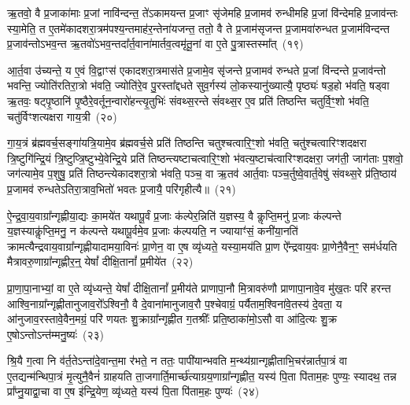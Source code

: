 ऋ॒तवो॒ वै प्र॒जाका॑माः प्र॒जां नावि॑न्दन्त॒ ते॑\-ऽकामयन्त प्र॒जाꣳ सृ॑जेमहि प्र॒जामव॑ रुन्धीमहि प्र॒जां वि॑न्देमहि प्र॒जाव॑न्तः स्या॒मेति॒ त ए॒तमे॑कादशरा॒त्रम॑पश्य॒न्तमाह॑र॒न्तेना॑यजन्त॒ ततो॒ वै ते प्र॒जाम॑सृजन्त प्र॒जामवा॑रुन्धत प्र॒जाम॑विन्दन्त प्र॒जाव॑न्तो\-ऽभव॒न्त ऋ॒तवो॑\-ऽभव॒न्तदा᳚र्त॒वाना॑मार्तव॒त्वमृ॑तू॒नां वा ए॒ते पु॒त्रास्तस्मा᳚त्~(१९)\ip

आ॒र्त॒वा उ॑च्यन्ते॒ य ए॒वं वि॒द्वाꣳस॑ एकादशरा॒त्रमास॑ते प्र॒जामे॒व सृ॑जन्ते प्र॒जामव॑ रुन्धते प्र॒जां वि॑न्दन्ते प्र॒जाव॑न्तो भवन्ति॒ ज्योति॑रतिरा॒त्रो भ॑वति॒ ज्योति॑रे॒व पु॒रस्ता᳚द्दधते सुव॒र्गस्य॑ लो॒कस्यानु॑ख्यात्यै॒ पृष्ठ्यः॑ षड॒हो भ॑वति॒ षड्वा ऋ॒तवः॒ षट्पृ॒ष्ठानि॑ पृ॒ष्ठैरे॒वर्तून॒न्वारो॑हन्त्यृ॒तुभिः॑ संवथ्स॒रन्ते सं॑वथ्स॒र ए॒व प्रति॑ तिष्ठन्ति चतुर्वि॒ꣳ॒शो भ॑वति॒ चतु॑र्विꣳशत्यक्षरा गाय॒त्री~(२०)\ip

गा॒य॒त्रं ब्र॑ह्मवर्च॒सङ्गा॑यत्रि॒यामे॒व ब्र॑ह्मवर्च॒से प्रति॑ तिष्ठन्ति चतुश्चत्वारि॒ꣳ॒शो भ॑वति॒ चतु॑श्चत्वारिꣳशद\-क्षरा त्रि॒ष्टुगि॑न्द्रि॒यं त्रि॒ष्टुप्त्रि॒ष्टुभ्ये॒वेन्द्रि॒ये प्रति॑ तिष्ठन्त्यष्टाचत्वारि॒ꣳ॒शो भ॑वत्य॒ष्टाच॑त्वारिꣳशद\-क्षरा॒ जग॑ती॒ जाग॑ताः प॒शवो॒ जग॑त्यामे॒व प॒शुषु॒ प्रति॑ तिष्ठन्त्येकादशरा॒त्रो भ॑वति॒ पञ्च॒ वा ऋ॒तव॑ आर्त॒वाः पञ्च॒र्तुष्वे॒वार्त॒वेषु॑ संवथ्स॒रे प्र॑ति॒ष्ठाय॑ प्र॒जामव॑ रुन्धते\-ऽतिरा॒त्राव॒भितो॑ भवतः प्र॒जायै॒ परि॑गृहीत्यै॥~(२१)\ip

{\anuvakamend[{तस्मा᳚द्\-गाय॒त्र्येका॒न्नप॑ञ्चा॒शच्च॑}]}

ऐ॒न्द्र॒वा॒य॒वाग्रा᳚न्गृह्णीया॒द्यः का॒मये॑त यथापू॒र्वं प्र॒जाः क॑ल्पेर॒न्निति॑ य॒ज्ञस्य॒ वै कॢप्ति॒मनु॑ प्र॒जाः क॑ल्पन्ते य॒ज्ञस्याकॢ॑प्ति॒मनु॒ न क॑ल्पन्ते यथापू॒र्वमे॒व प्र॒जाः क॑ल्पयति॒ न ज्यायाꣳ॑सं॒ कनी॑या॒नति॑ क्रामत्यैन्द्रवाय॒वाग्रा᳚न्गृह्णीयादामया॒विनः॑ प्रा॒णेन॒ वा ए॒ष व्यृ॑ध्यते॒ यस्या॒मय॑ति प्रा॒ण ऐ᳚न्द्रवाय॒वः प्रा॒णेनै॒वैन॒ꣳ॒ सम॑र्धयति मैत्रावरु॒णाग्रा᳚न्गृह्णीर॒न्॒ येषां᳚ दीक्षि॒तानां᳚ प्र॒मीये॑त~(२२)\ip

प्रा॒णा॒पा॒नाभ्यां॒ वा ए॒ते व्यृ॑ध्यन्ते॒ येषां᳚ दीक्षि॒तानां᳚ प्र॒मीय॑ते प्राणापा॒नौ मि॒त्रावरु॑णौ प्राणापा॒नावे॒व मु॑ख॒तः परि॑ हरन्त आश्वि॒नाग्रा᳚न्गृह्णीतानुजाव॒रो᳚\-ऽश्विनौ॒ वै दे॒वाना॑मानुजाव॒रौ प॒श्चेवाग्रं॒ पर्यैताम॒श्विना॑वे॒तस्य॑ दे॒वता॒ य आ॑नुजाव॒रस्तावे॒वैन॒मग्रं॒ परि॑ णयतः शु॒क्राग्रा᳚न्गृह्णीत ग॒तश्रीः᳚ प्रति॒ष्ठाका॑मो॒\-ऽसौ वा आ॑दि॒त्यः शु॒क्र ए॒षो\-ऽन्तो\-ऽन्त॑म्मनु॒ष्यः॑~(२३)\ip

श्रि॒यै ग॒त्वा नि व॑र्त॒ते\-ऽन्ता॑दे॒वान्त॒मा र॑भते॒ न ततः॒ पापी॑यान्भवति म॒न्थ्य॑ग्रान्गृह्णीताभि॒चर॑न्नार्तपा॒त्रं वा ए॒तद्यन्म॑न्थिपा॒त्रं मृ॒त्युनै॒वैनं॑ ग्राहयति ता॒जगार्ति॒मार्च्छ॑त्याग्रय॒णाग्रा᳚न्गृह्णीत॒ यस्य॑ पि॒ता पि॑ताम॒हः पुण्यः॒ स्यादथ॒ तन्न प्रा᳚प्नु॒याद्वा॒चा वा ए॒ष इ॑न्द्रि॒येण॒ व्यृ॑ध्यते॒ यस्य॑ पि॒ता पि॑ताम॒हः पुण्यः॑~(२४)\ip

